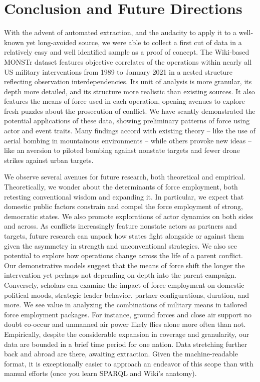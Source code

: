 \documentclass[fleqn,12pt]{article}
\begin{document}
\section*{Conclusion and Future Directions}
With the advent of automated extraction, and the audacity to apply it to a well-known yet long-avoided source, we were able to collect a first cut of data in a relatively easy and well identified sample as a proof of concept. The Wiki-based MONSTr dataset features objective correlates of the operations within nearly all US military interventions from 1989 to January 2021 in a nested structure reflecting observation interdependencies. Its unit of analysis is more granular, its depth more detailed, and its structure more realistic than existing sources. It also features the means of force used in each operation, opening avenues to explore fresh puzzles about the prosecution of conflict. We have scantly demonstrated the potential applications of these data, showing preliminary patterns of force using actor and event traits. Many findings accord with existing theory -- like the use of aerial bombing in mountainous environments -- while others provoke new ideas -- like an aversion to piloted bombing against nonstate targets and fewer drone strikes against urban targets.

We observe several avenues for future research, both theoretical and empirical. Theoretically, we wonder about the determinants of force employment, both retesting conventional wisdom and expanding it. In particular, we expect that domestic public factors constrain and compel the force employment of strong, democratic states. We also promote explorations of actor dynamics on both sides and across. As conflicts increasingly feature nonstate actors as partners and targets, future research can unpack how states fight alongside or against them given the asymmetry in strength and unconventional strategies. We also see potential to explore how operations change across the life of a parent conflict. Our demonstrative models suggest that the means of force shift the longer the intervention yet perhaps not depending on depth into the parent campaign. Conversely, scholars can examine the impact of force employment on domestic political moods, strategic leader behavior, partner configurations, duration, and more. We see value in analyzing the combinations of military means in tailored force employment packages. For instance, ground forces and close air support no doubt co-occur and unmanned air power likely flies alone more often than not. Empirically, despite the considerable expansion in coverage and granularity, our data are bounded in a brief time period for one nation. Data stretching further back and abroad are there, awaiting extraction. Given the machine-readable format, it is exceptionally easier to approach an endeavor of this scope than with manual efforts (once you learn SPARQL and Wiki's anatomy). 
\end{document}
